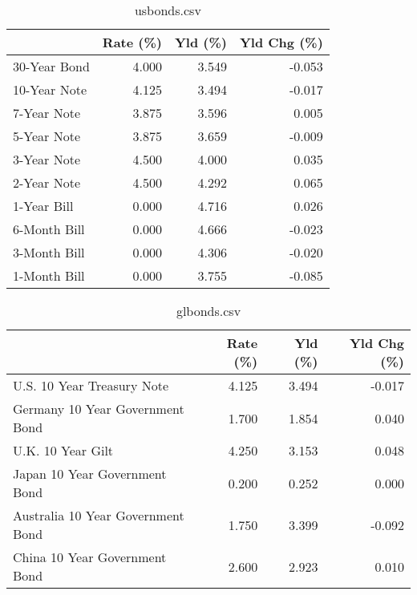 \documentclass{article}%
\begin{document}
%


\begin{table}[htbp]%
\caption{usbonds.csv}%
\centering%
\begin{adjustbox}{width=1\textwidth}%
\begin{tabular}{lrrr}
\toprule
             &  Rate (\%) &  Yld (\%) &  Yld Chg (\%) \\
\midrule
30-Year Bond &     4.000 &    3.549 &       -0.053 \\
10-Year Note &     4.125 &    3.494 &       -0.017 \\
 7-Year Note &     3.875 &    3.596 &        0.005 \\
 5-Year Note &     3.875 &    3.659 &       -0.009 \\
 3-Year Note &     4.500 &    4.000 &        0.035 \\
 2-Year Note &     4.500 &    4.292 &        0.065 \\
 1-Year Bill &     0.000 &    4.716 &        0.026 \\
6-Month Bill &     0.000 &    4.666 &       -0.023 \\
3-Month Bill &     0.000 &    4.306 &       -0.020 \\
1-Month Bill &     0.000 &    3.755 &       -0.085 \\
\bottomrule
\end{tabular}
%
\end{adjustbox}%
\end{table}

%


\begin{table}[htbp]%
\caption{glbonds.csv}%
\centering%
\begin{adjustbox}{width=1\textwidth}%
\begin{tabular}{lrrr}
\toprule
                                  &  Rate (\%) &  Yld (\%) &  Yld Chg (\%) \\
\midrule
       U.S. 10 Year Treasury Note &     4.125 &    3.494 &       -0.017 \\
  Germany 10 Year Government Bond &     1.700 &    1.854 &        0.040 \\
                U.K. 10 Year Gilt &     4.250 &    3.153 &        0.048 \\
    Japan 10 Year Government Bond &     0.200 &    0.252 &        0.000 \\
Australia 10 Year Government Bond &     1.750 &    3.399 &       -0.092 \\
    China 10 Year Government Bond &     2.600 &    2.923 &        0.010 \\
\bottomrule
\end{tabular}
%
\end{adjustbox}%
\end{table}
\end{document}

